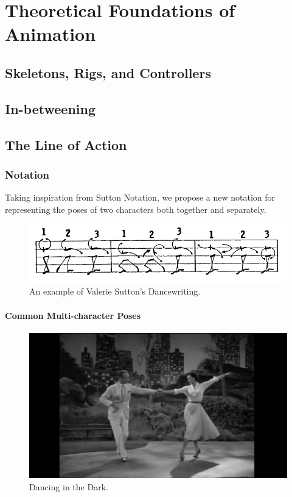 \chapter{Theoretical Foundations of Animation}\label{chap:theory}

\section{Skeletons, Rigs, and Controllers}


\section{In-betweening}


\section{The Line of Action}
\subsection{Notation}
Taking inspiration from Sutton Notation, we propose a new notation for representing the poses of two characters both together and separately.

\begin{figure}[!h]
\centering
\includegraphics[scale=0.4]{img/sutton}
\caption{An example of Valerie Sutton's Dancewriting.}
\end{figure}

\subsubsection{Common Multi-character Poses}
\begin{figure}
\centering
\includegraphics[scale=0.1]{img/bandwagon}
\caption{Dancing in the Dark.}
\end{figure}

